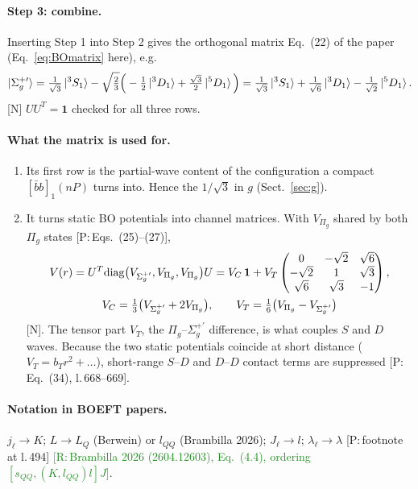 \documentclass[11pt,a4paper]{article}
\newcommand{\tagP}[1]{\textcolor{blue!65!black}{\textsf{\small[P:\,#1]}}}
\newcommand{\tagR}[1]{\textcolor{ForestGreen}{\textsf{\small[R:\,#1]}}}
\newcommand{\tagN}{\textcolor{red!70!black}{\textsf{\small[N]}}}
\newcommand{\bbnP}{[\bar bb]_1(nP)}
\begin{document}
\paragraph{Step 3: combine.} Inserting Step 1 into Step 2 gives the orthogonal matrix Eq.~(22) of the paper (Eq.~\eqref{eq:BOmatrix} here), e.g.
\begin{equation}
\ket{\Sigma_g^{+\prime}}=\tfrac{1}{\sqrt3}\ket{^3S_1}-\sqrt{\tfrac23}\Big(-\tfrac12\ket{^3D_1}+\tfrac{\sqrt3}{2}\ket{^5D_1}\Big)=\tfrac{1}{\sqrt3}\ket{^3S_1}+\tfrac{1}{\sqrt6}\ket{^3D_1}-\tfrac{1}{\sqrt2}\ket{^5D_1}.
\end{equation}
\tagN{} $UU^T=\mathbf 1$ checked for all three rows.

\paragraph{What the matrix is used for.}
\begin{enumerate}
\item Its first row is the partial-wave content of the configuration a compact $\bbnP$ turns into. Hence the $1/\sqrt3$ in $g$ (Sect.~\ref{sec:g}).
\item It turns static BO potentials into channel matrices. With $V_{\Pi_g}$ shared by both $\Pi_g$ states \tagP{Eqs.~(25)--(27)},
\begin{gather}
V(r)=U^T{\rm diag}\big(V_{\Sigma_g^{+\prime}},V_{\Pi_g},V_{\Pi_g}\big)U=V_C\,\mathbf 1+V_T\begin{pmatrix}0&-\sqrt2&\sqrt6\\-\sqrt2&1&\sqrt3\\\sqrt6&\sqrt3&-1\end{pmatrix},\\
V_C=\tfrac13\big(V_{\Sigma_g^{+\prime}}+2V_{\Pi_g}\big),\qquad V_T=\tfrac16\big(V_{\Pi_g}-V_{\Sigma_g^{+\prime}}\big)
\end{gather}
\tagN. The tensor part $V_T$, the $\Pi_g$--$\Sigma_g^{+\prime}$ difference, is what couples $S$ and $D$ waves. Because the two static potentials coincide at short distance ($V_T=b_Tr^2+\dots$), short-range $S$--$D$ and $D$--$D$ contact terms are suppressed \tagP{Eq.~(34), l.\,668--669}.
\end{enumerate}

\paragraph{Notation in BOEFT papers.} $j_\ell\to K$; $L\to L_Q$ (Berwein) or $l_{QQ}$ (Brambilla 2026); $J_\ell\to l$; $\lambda_\ell\to\lambda$ \tagP{footnote at l.\,494} \tagR{Brambilla 2026 (2604.12603), Eq.~(4.4), ordering $[s_{QQ},(K,l_{QQ})l]J$}.
\end{document}
